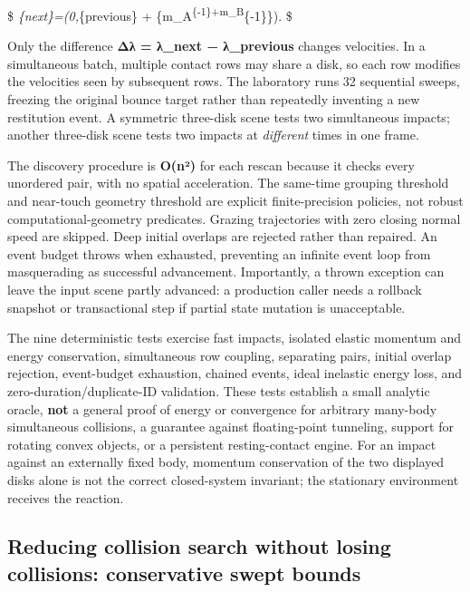 \$ \lambda\emph{\{next\}=\max\left(0,\lambda}\{previous\} + \{m\_A\textsuperscript{\{-1\}+m\_B}\{-1\}\}\right). \$

Only the difference \textbf{Δλ = λ\_next − λ\_previous} changes velocities. In a simultaneous batch, multiple contact rows may share a disk, so each row modifies the velocities seen by subsequent rows. The laboratory runs 32 sequential sweeps, freezing the original bounce target rather than repeatedly inventing a new restitution event. A symmetric three-disk scene tests two simultaneous impacts; another three-disk scene tests two impacts at \emph{different} times in one frame.

The discovery procedure is \textbf{O(n²)} for each rescan because it checks every unordered pair, with no spatial acceleration. The same-time grouping threshold and near-touch geometry threshold are explicit finite-precision policies, not robust computational-geometry predicates. Grazing trajectories with zero closing normal speed are skipped. Deep initial overlaps are rejected rather than repaired. An event budget throws when exhausted, preventing an infinite event loop from masquerading as successful advancement. Importantly, a thrown exception can leave the input scene partly advanced: a production caller needs a rollback snapshot or transactional step if partial state mutation is unacceptable.

The nine deterministic tests exercise fast impacts, isolated elastic momentum and energy conservation, simultaneous row coupling, separating pairs, initial overlap rejection, event-budget exhaustion, chained events, ideal inelastic energy loss, and zero-duration/duplicate-ID validation. These tests establish a small analytic oracle, \textbf{not} a general proof of energy or convergence for arbitrary many-body simultaneous collisions, a guarantee against floating-point tunneling, support for rotating convex objects, or a persistent resting-contact engine. For an impact against an externally fixed body, momentum conservation of the two displayed disks alone is not the correct closed-system invariant; the stationary environment receives the reaction.

\subsection{Reducing collision search without losing collisions: conservative swept bounds}\label{appendix-c9d92e145503-reducing-collision-search-without-losing-collisions-conservative-swept-bounds}

